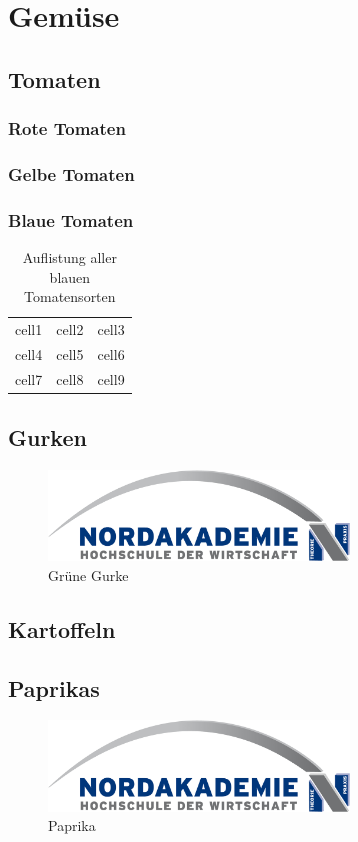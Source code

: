 \blindtext

\section{Gemüse}
\blindtext

\subsection{Tomaten}
\blindtext

\subsubsection{Rote Tomaten}
\blindtext

\subsubsection{Gelbe Tomaten}
\blindtext

\subsubsection{Blaue Tomaten}
\blindtext

\begin{table}[ht]
    \begin{tabular}{ c c c }
        cell1 & cell2 & cell3 \\ 
        cell4 & cell5 & cell6 \\  
        cell7 & cell8 & cell9 \\
    \end{tabular}
    \caption{Auflistung aller blauen Tomatensorten}
\end{table}

\subsection{Gurken}
\blindtext

\begin{figure}[ht]
    \includegraphics[width=8cm]{dokumente/bilder/Nordakademie_Logo_gross.jpg}
    \centering
    \caption{Grüne Gurke}
\end{figure}

\subsection{Kartoffeln}
\blindtext

\subsection{Paprikas}

\begin{figure}[ht]
    \includegraphics[width=8cm]{dokumente/bilder/Nordakademie_Logo_gross.jpg}
    \centering
    \caption{Paprika}
\end{figure}

\blindtext